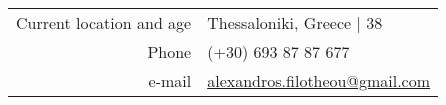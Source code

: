 \documentclass[a4paper,10pt,twoside]{article}
\begin{document}


\par{\bigskip\par}
\vspace{4em}
\begin{center}
\begin{tabular}{rp{10cm}}
Current location and age                & Thessaloniki, Greece | $38$ \\
Phone                                   & (+30) 693 87 87 677 \\
e-mail                                  & \href{mailto:alexandros.filotheou@gmail.com}{alexandros.filotheou@gmail.com}
\end{tabular}
\end{center}

\vfill
\end{document}
